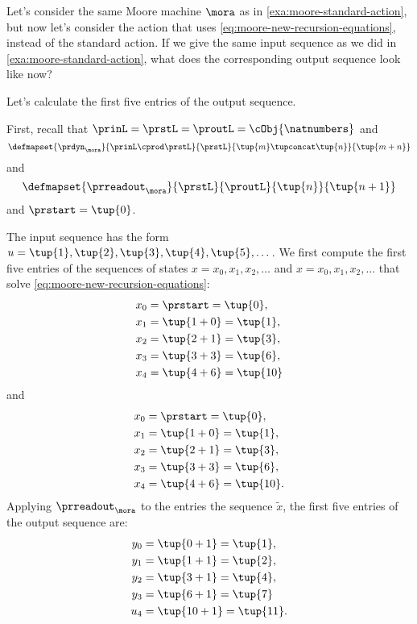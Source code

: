 \begin{example}
Let's consider the same Moore machine $\mora$ as in \cref{exa:moore-standard-action}, but now let's consider the action that uses \cref{eq:moore-new-recursion-equations}, instead of the standard action. If we give the same input sequence as we did in \cref{exa:moore-standard-action}, what does the corresponding output sequence look like now?

Let's calculate the first five entries of the output sequence. 

First, recall that $\prinL = \prstL = \proutL = \cObj{\natnumbers}$
and 
\begin{equation}
\defmapset{
\prdyn_\mora
}{
\prinL \cprod \prstL
}{
\prstL
}{
\tup{m} \tupconcat \tup{n}
}{
\tup{m + n}
}
\end{equation}
and 
\begin{equation}
\defmapset{
\prreadout_\mora
}{
\prstL
}{
\proutL
}{
\tup{n}
}{
\tup{n+1}
}
\end{equation}
and $\prstart = \tup{0}$. 

The input sequence has the form $u = \tup{1}, \tup{2}, \tup{3}, \tup{4}, \tup{5}, \dots$. We first compute the first five entries of the sequences of states $x = x_0, x_1, x_2, \dots$ and $x = x_0, x_1, x_2, \dots$ that solve \cref{eq:moore-new-recursion-equations}:
\begin{align*}
x_0 &= \prstart = \tup{0}, \\
x_1 &= \tup{1 + 0} = \tup{1}, \\
x_2 &= \tup{2 + 1} = \tup{3}, \\
x_3 &= \tup{3 + 3} = \tup{6}, \\
x_4 &= \tup{4 + 6} = \tup{10}
\end{align*}
and
\begin{align*}
x_0 &= \prstart = \tup{0}, \\
x_1 &= \tup{1 + 0} = \tup{1}, \\
x_2 &= \tup{2 + 1} = \tup{3}, \\
x_3 &= \tup{3 + 3} = \tup{6}, \\
x_4 &= \tup{4 + 6} = \tup{10}.
\end{align*}
Applying $\prreadout_\mora$ to the entries the sequence $\tilde x$, the first five entries of the output sequence are:
\begin{align*}
y_0 &= \tup{0 + 1} = \tup{1}, \\
y_1 &= \tup{1 + 1} = \tup{2}, \\
y_2 &= \tup{3 + 1} = \tup{4}, \\
y_3 &= \tup{6 + 1} = \tup{7} \\
u_4 &= \tup{10 + 1} = \tup{11}.
\end{align*}
\end{example}


